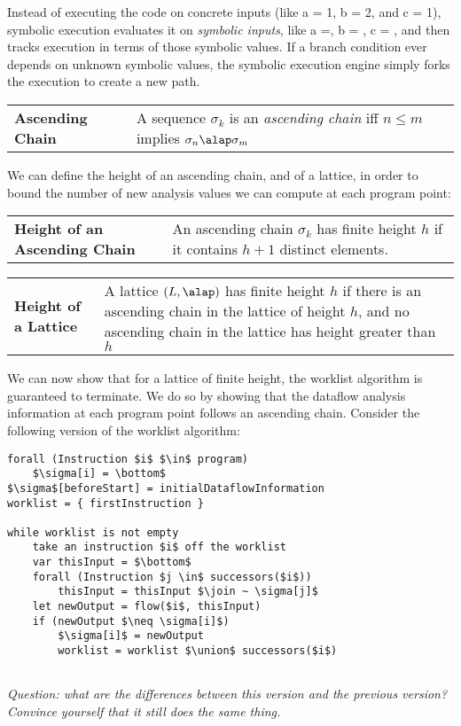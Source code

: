\documentclass[11pt]{article}
\newcommand{\definition}[2]
  {\bigskip
   \begin{tabular}{p{1.5in}p{4.0in}}
        \textbf{#1} & #2 \\
        \end{tabular}
  }
\begin{document}
Instead of executing the code on concrete inputs (like a = 1, b = 2, and c = 1), symbolic execution evaluates it on \emph{symbolic inputs}, like a =\alpha, b = \beta, c = \gamma, and then tracks execution in terms of those symbolic values.  If a branch condition ever depends on unknown symbolic values, the symbolic execution engine simply forks the execution to create a new path.  


\definition{Ascending Chain}{A sequence ${\sigma_k}$ is an \textit{ascending chain} iff $n \le m$ implies $\sigma_n \alap \sigma_m$}

\noindent We can define the height of an ascending chain, and of a lattice, in order to bound the number of new analysis values we can compute at each program point:

\definition{Height of an Ascending Chain}{An ascending chain ${\sigma_k}$ has finite height $h$ if it contains $h+1$ distinct elements.}

\definition{Height of a Lattice}{A lattice $(L,\alap)$ has finite height $h$ if there is an ascending chain in the lattice of height $h$, and no ascending chain in the lattice has height greater than $h$}


We can now show that for a lattice of finite height, the worklist algorithm is guaranteed to terminate.  We do so by showing that the dataflow analysis information at each program point follows an ascending chain.  Consider the following version of the worklist algorithm:

\begin{lstlisting}[mathescape]
forall (Instruction $i$ $\in$ program)
    $\sigma[i] = \bottom$
$\sigma$[beforeStart] = initialDataflowInformation
worklist = { firstInstruction }

while worklist is not empty
    take an instruction $i$ off the worklist
	var thisInput = $\bottom$
	forall (Instruction $j \in$ successors($i$))
		thisInput = thisInput $\join ~ \sigma[j]$
    let newOutput = flow($i$, thisInput)
	if (newOutput $\neq \sigma[i]$)
		$\sigma[i]$ = newOutput
		worklist = worklist $\union$ successors($i$)
	
\end{lstlisting}

\noindent \textit{Question: what are the differences between this version and the previous version?  Convince yourself that it still does the same thing.}
\end{document}
